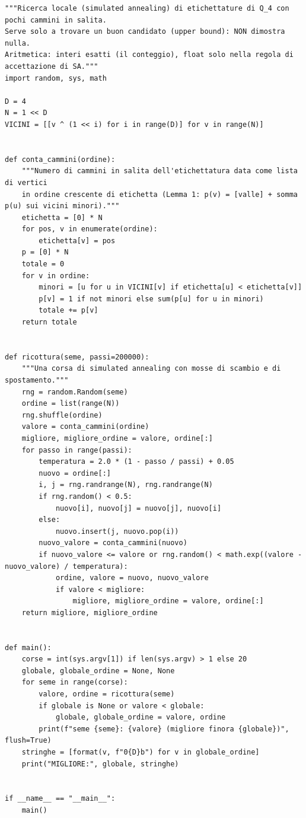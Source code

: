 \documentclass[11pt,a4paper]{article}
\begin{document}
\begin{lstlisting}[caption={attempt\_001 code\_3 [python, rigore float\_exploration\_only] — Heuristic simulated annealing to find an incumbent labelling (upper bound candidate). 12 s — verdetto del Referee: (nessun verdetto)}]
"""Ricerca locale (simulated annealing) di etichettature di Q_4 con pochi cammini in salita.
Serve solo a trovare un buon candidato (upper bound): NON dimostra nulla.
Aritmetica: interi esatti (il conteggio), float solo nella regola di accettazione di SA."""
import random, sys, math

D = 4
N = 1 << D
VICINI = [[v ^ (1 << i) for i in range(D)] for v in range(N)]


def conta_cammini(ordine):
    """Numero di cammini in salita dell'etichettatura data come lista di vertici
    in ordine crescente di etichetta (Lemma 1: p(v) = [valle] + somma p(u) sui vicini minori)."""
    etichetta = [0] * N
    for pos, v in enumerate(ordine):
        etichetta[v] = pos
    p = [0] * N
    totale = 0
    for v in ordine:
        minori = [u for u in VICINI[v] if etichetta[u] < etichetta[v]]
        p[v] = 1 if not minori else sum(p[u] for u in minori)
        totale += p[v]
    return totale


def ricottura(seme, passi=200000):
    """Una corsa di simulated annealing con mosse di scambio e di spostamento."""
    rng = random.Random(seme)
    ordine = list(range(N))
    rng.shuffle(ordine)
    valore = conta_cammini(ordine)
    migliore, migliore_ordine = valore, ordine[:]
    for passo in range(passi):
        temperatura = 2.0 * (1 - passo / passi) + 0.05
        nuovo = ordine[:]
        i, j = rng.randrange(N), rng.randrange(N)
        if rng.random() < 0.5:
            nuovo[i], nuovo[j] = nuovo[j], nuovo[i]
        else:
            nuovo.insert(j, nuovo.pop(i))
        nuovo_valore = conta_cammini(nuovo)
        if nuovo_valore <= valore or rng.random() < math.exp((valore - nuovo_valore) / temperatura):
            ordine, valore = nuovo, nuovo_valore
            if valore < migliore:
                migliore, migliore_ordine = valore, ordine[:]
    return migliore, migliore_ordine


def main():
    corse = int(sys.argv[1]) if len(sys.argv) > 1 else 20
    globale, globale_ordine = None, None
    for seme in range(corse):
        valore, ordine = ricottura(seme)
        if globale is None or valore < globale:
            globale, globale_ordine = valore, ordine
        print(f"seme {seme}: {valore} (migliore finora {globale})", flush=True)
    stringhe = [format(v, f"0{D}b") for v in globale_ordine]
    print("MIGLIORE:", globale, stringhe)


if __name__ == "__main__":
    main()

\end{lstlisting}
\end{document}
